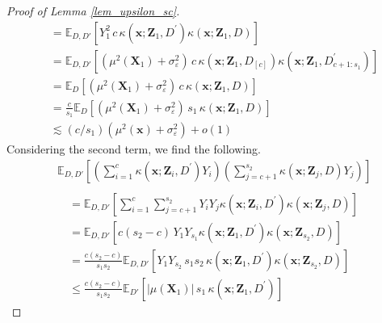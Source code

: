 \documentclass[letterpaper,10pt]{article}
\numberwithin{equation}{section}
\numberwithin{thm}{section}
\numberwithin{lem}{section}
\numberwithin{cor}{section}
\newcommand{\E}{\mathbb{E}}
\newcommand{\1}{\mathbbm{1}}
\begin{document}
\begin{proof}[Proof of Lemma \ref{lem_upsilon_sc}]
\begin{equation}
\begin{aligned}
			 & = \E_{D, D'}\left[Y_{1}^2 \, c \, \kappa(\mathbf{x}; \mathbf{Z}_1, D^{\prime})\kappa(\mathbf{x}; \mathbf{Z}_1, D)\right]                                                                     \\
			 & = \E_{D, D'}\left[\left(\mu^2(\mathbf{X}_{1}) + \sigma^2_{\varepsilon}\right) \, c \, \kappa(\mathbf{x}; \mathbf{Z}_1, D_{[c]})\kappa(\mathbf{x}; \mathbf{Z}_1, D^{\prime}_{c+1:s_1})\right] \\
			 & = \E_{D}\left[\left(\mu^2(\mathbf{X}_{1}) + \sigma^2_{\varepsilon}\right) \, c \, \kappa(\mathbf{x}; \mathbf{Z}_1, D)\right]                                                                 \\
			 & = \frac{c}{s_1} \E_{D}\left[\left(\mu^2(\mathbf{X}_{1}) + \sigma^2_{\varepsilon}\right) \, s_1 \, \kappa(\mathbf{x}; \mathbf{Z}_1, D)\right]                                                 \\
			 & \lesssim (c/s_1)(\mu^2(\mathbf{x}) + \sigma^2_{\varepsilon}) + o(1)
		\end{aligned}
	\end{equation}
	Considering the second term, we find the following.
	\begin{equation}
		\begin{aligned}
			 & \E_{D, D'}\left[\left(\sum_{i = 1}^{c}\kappa(\mathbf{x}; \mathbf{Z}_i, D^{\prime}) Y_i\right)
			\left(\sum_{j = c+1}^{s_2} \kappa(\mathbf{x}; \mathbf{Z}_j, D) Y_j\right)\right]                                                                                          \\                                                                                                                                                                         \\
			 & \quad = \E_{D, D'}\left[\sum_{i = 1}^{c}\sum_{j = c+1}^{s_2}Y_i Y_j \kappa(\mathbf{x}; \mathbf{Z}_i, D^{\prime})\kappa(\mathbf{x}; \mathbf{Z}_j, D)\right]             \\
			 & \quad = \E_{D, D'}\left[c(s_2 - c) \, Y_1 Y_{s_1} \kappa(\mathbf{x}; \mathbf{Z}_1, D^{\prime})\kappa(\mathbf{x}; \mathbf{Z}_{s_2}, D)\right]                           \\
			 & \quad = \frac{c (s_2 - c)}{s_1 s_2}\E_{D, D'}\left[Y_1 Y_{s_2} \, s_1 s_2 \,\kappa(\mathbf{x}; \mathbf{Z}_1, D^{\prime})\kappa(\mathbf{x}; \mathbf{Z}_{s_2}, D)\right] \\
			 & \quad \leq \frac{c (s_2 - c)}{s_1 s_2}
			\E_{D'}\left[|\mu(\mathbf{X}_1)| \, s_1  \,\kappa(\mathbf{x}; \mathbf{Z}_1, D^{\prime})\right]

\end{aligned}
\end{equation}
\end{proof}
\end{document}
